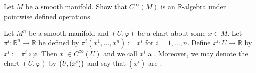 \begin{exercise}
	Let $M$ be a smooth manifold. Show that $C^\infty(M)$ is an $\mathbb{R}$-algebra under pointwise defined operations.
\end{exercise}

\begin{example}
	Let $M^n$ be a smooth manifold and $(U,\varphi)$ be a chart about some $x \in M$. Let $\pi^i : \mathbb{R}^n \to \mathbb{R}$ be defined by $\pi^i(x^1,\dots,x^n) := x^i$ for $i = 1,\dots,n$. Define $x^i : U \to \mathbb{R}$ by $x^i := \pi^i \circ \varphi$. Then $x^i \in C^\infty(U)$ and we call $x^i$ a . Moreover, we may denote the chart $(U,\varphi)$ by $\del[1]{U,(x^i)}$ and say that $(x^i)$ are . 
\end{example}

